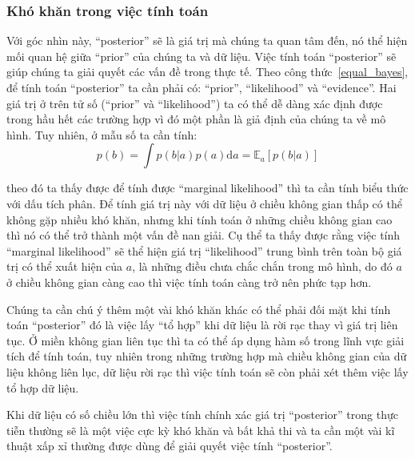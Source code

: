         \subsubsection{Khó khăn trong việc tính toán}
        Với góc nhìn này, ``posterior'' sẽ là giá trị mà chúng ta quan tâm đến, nó thể hiện mối quan hệ giữa ``prior'' của chúng ta và dữ liệu. 
        Việc tính toán ``posterior'' sẽ giúp chúng ta giải quyết các vấn đề trong thực tế.
        Theo công thức~\ref{equal_bayes}, để tính toán ``posterior'' ta cần phải có: ``prior'', ``likelihood'' và ``evidence''. Hai giá trị ở trên tử số (``prior'' và ``likelihood'') ta có thể dễ dàng xác định được trong hầu hết các trường hợp vì đó một phần là giả định của chúng ta về mô hình. Tuy nhiên, ở mẫu số ta cần tính:
        \begin{equation}
        \label{equal_evidence}
            p(b) = \int {p(b|a)p(a)\text{d}a = \mathbb{E}_a[p(b|a)]}    
        \end{equation}
        
        theo đó ta thấy được để tính được ``marginal likelihood'' thì ta cần tính biểu thức với dấu tích phân. Để tính giá trị này với dữ liệu ở chiều không gian thấp có thể không gặp nhiều khó khăn, nhưng khi tính toán ở những chiều không gian cao thì nó có thể trở thành một vấn đề nan giải. 
        Cụ thể ta thấy được rằng việc tính ``marginal likelihood'' sẽ thể hiện giá trị ``likelihood'' trung bình trên toàn bộ giá trị có thể xuất hiện của $a$, là những điều chưa chắc chắn trong mô hình, do đó $a$ ở chiều không gian càng cao thì việc tính toán càng trở nên phức tạp hơn. 

        Chúng ta cần chú ý thêm một vài khó khăn khác có thể phải đối mặt khi tính toán ``posterior'' đó là việc lấy ``tổ hợp'' khi dữ liệu là rời rạc thay vì giá trị liên tục. 
        Ở miền không gian liên tục thì ta có thể áp dụng hàm số trong lĩnh vực giải tích để tính toán, tuy nhiên trong những trường hợp mà chiều không gian của dữ liệu không liên lục, dữ liệu rời rạc thì việc tính toán sẽ còn phải xét thêm việc lấy tổ hợp dữ liệu. 

        Khi dữ liệu có số chiều lớn thì việc tính chính xác giá trị ``posterior'' trong thực tiễn thường sẽ là một việc cực kỳ khó khăn và bất khả thi và ta cần một vài kĩ thuật xấp xỉ thường được dùng để giải quyết việc tính ``posterior''. 

